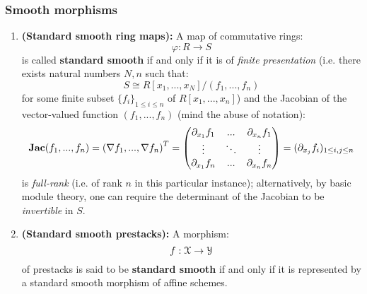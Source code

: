             \subsubsection{Smooth morphisms}
                \begin{definition} \label{def: standard_smoothness} 
                    \noindent
                    \begin{enumerate}
                        \item \textbf{(Standard smooth ring maps):} A map of commutative rings:
                            $$\varphi: R \to S$$
                        is called \textbf{standard smooth} if and only if it is of \textit{finite presentation} (i.e. there exists natural numbers $N, n$ such that:
                            $$S \cong R[x_1, ..., x_N]/(f_1, ..., f_n)$$
                        for some finite subset $\{f_i\}_{1 \leq i \leq n}$ of $R[x_1, ..., x_n]$) and the Jacobian of the vector-valued function $(f_1, ..., f_n)$ (mind the abuse of notation):
                            $$\mathbf{Jac}(f_1, ..., f_n) = \left(\nabla f_1, ..., \nabla f_n\right)^T = 
                                \begin{pmatrix}
                                    \partial_{x_1} f_1 & ... & \partial_{x_n} f_1
                                    \\
                                    \vdots & \ddots & \vdots
                                    \\
                                    \partial_{x_1} f_n & ... & \partial_{x_n} f_n
                                \end{pmatrix}
                            = (\partial_{x_j} f_i)_{1 \leq i, j \leq n}$$
                        is \textit{full-rank} (i.e. of rank $n$ in this particular instance); alternatively, by basic module theory, one can require the determinant of the Jacobian to be \textit{invertible} in $S$.  
                        \item \textbf{(Standard smooth prestacks):} A morphism:
                            $$f: \mathcal{X} \to \mathcal{Y}$$
                        of prestacks is said to be \textbf{standard smooth} if and only if it is represented by a standard smooth morphism of affine schemes.
                    \end{enumerate}
                \end{definition}

